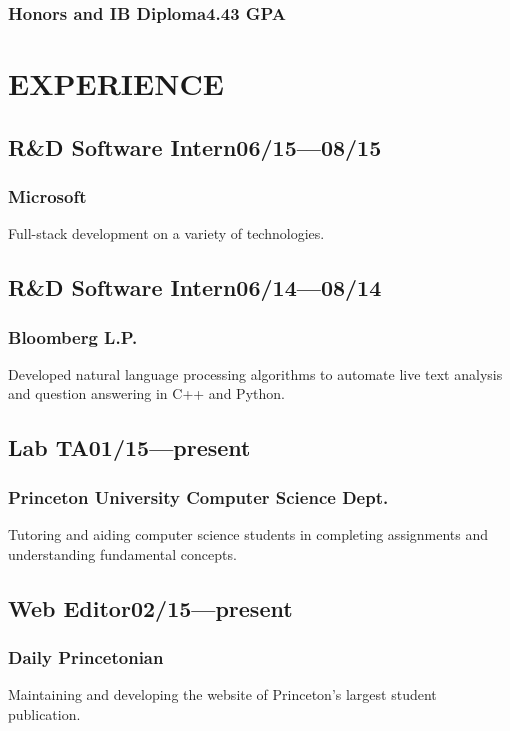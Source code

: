\documentclass[11pt]{article}
\begin{document}
\begin{multicols}{2}
  \subsubsection*{Honors and IB Diploma\hfill\textnormal{4.43 GPA}}
  \vspace{1.5\baselineskip}

  \section*{EXPERIENCE}
  \subsection*{R\&D Software Intern\hfill\textnormal{06/15---08/15}}
  \subsubsection*{Microsoft}
  Full-stack development on a variety of technologies.

  \subsection*{R\&D Software Intern\hfill\textnormal{06/14---08/14}}
  \subsubsection*{Bloomberg L.P.}
  Developed natural language processing algorithms to automate live text analysis and question answering in C++ and Python.

  \subsection*{Lab TA\hfill\textnormal{01/15---present}}
  \subsubsection*{Princeton University Computer Science Dept.}
  Tutoring and aiding computer science students in completing assignments and understanding fundamental concepts.

  \subsection*{Web Editor\hfill\textnormal{02/15---present}}
  \subsubsection*{Daily Princetonian}
  Maintaining and developing the website of Princeton's largest student publication.


\end{multicols}
\end{document}
